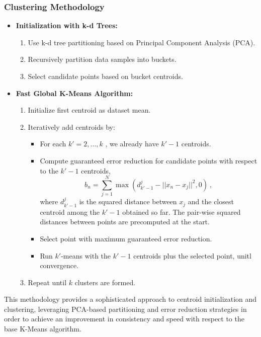 \subsubsection{Clustering Methodology}
\begin{itemize}
    \item \textbf{Initialization with k-d Trees:}
    \begin{enumerate}
        \item Use k-d tree partitioning based on Principal Component Analysis (PCA).
        \item Recursively partition data samples into buckets.
        \item Select candidate points based on bucket centroids.
    \end{enumerate}
    \item \textbf{Fast Global K-Means Algorithm:}
    \begin{enumerate}
        \item Initialize first centroid as dataset mean.
        \item Iteratively add centroids by:
            \begin{itemize}
                \item For each $k'=2,\ldots,k$ , we already have $k'-1$ centroids.
                \item Compute guaranteed error reduction for candidate points with respect to the $k'-1$ centroids,
                \[
                b_n = \sum\limits_{j=1}^N \max\left(d_{k'-1}^j - || x_n - x_j ||^2 , 0 \right) \ ,
                \]
                where $ d_{k'-1}^j $ is the squared distance between $ x_j $ and the closest centroid among the $k'-1$ obtained so far. The pair-wise squared distances between points are precomputed at the start.
                \item Select point with maximum guaranteed error reduction.
                \item Run $k'$-means with the $k'-1$ centroids plus the selected point, unitl convergence.
            \end{itemize}
        \item Repeat until $k$ clusters are formed.
    \end{enumerate}
\end{itemize}
This methodology provides a sophisticated approach to centroid initialization and clustering, leveraging PCA-based partitioning and error reduction strategies in order to achieve an improvement in consistency and speed with respect to the base K-Means algorithm.
